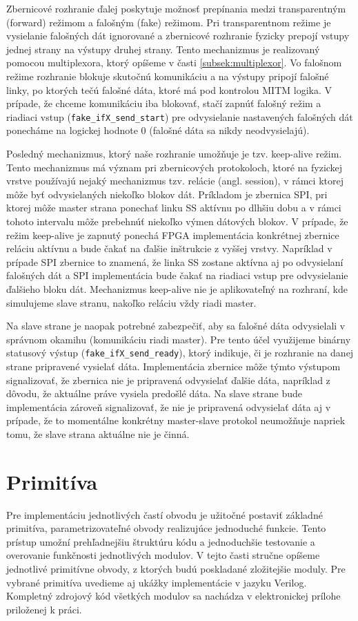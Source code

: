 Zbernicové rozhranie ďalej poskytuje možnosť prepínania medzi transparentným (forward) režimom a falošným (fake) režimom. Pri transparentnom režime je vysielanie falošných dát ignorované a zbernicové rozhranie fyzicky prepojí vstupy jednej strany na výstupy druhej strany. Tento mechanizmus je realizovaný pomocou multiplexora, ktorý opíšeme v časti \ref{subsek:multiplexor}. Vo falošnom režime rozhranie blokuje skutočnú komunikáciu a na výstupy pripojí falošné linky, po ktorých tečú falošné dáta, ktoré má pod kontrolou MITM logika. V prípade, že chceme komunikáciu iba blokovať, stačí zapnúť falošný režim a riadiaci vstup (\texttt{fake\_ifX\_send\_start}) pre odvysielanie nastavených falošných dát ponecháme na logickej hodnote 0 (falošné dáta sa nikdy neodvysielajú).

Posledný mechanizmus, ktorý naše rozhranie umožňuje je tzv. keep-alive režim. Tento mechanizmus má význam pri zbernicových protokoloch, ktoré na fyzickej vrstve používajú nejaký mechanizmus tzv. relácie (angl. session), v rámci ktorej môže byť odvysielaných niekoľko blokov dát. Príkladom je zbernica SPI, pri ktorej môže master strana ponechať linku SS aktívnu po dlhšiu dobu a v rámci tohoto intervalu môže prebehnúť niekoľko výmen dátových blokov. V prípade, že režim keep-alive je zapnutý ponechá FPGA implementácia konkrétnej zbernice reláciu aktívnu a bude čakať na ďalšie inštrukcie z vyššej vrstvy. Napríklad v prípade SPI zbernice to znamená, že linka SS zostane aktívna aj po odvysielaní falošných dát a SPI implementácia bude čakať na riadiaci vstup pre odvysielanie ďalšieho bloku dát. Mechanizmus keep-alive nie je aplikovateľný na rozhraní, kde simulujeme slave stranu, nakoľko reláciu vždy riadi master.

Na slave strane je naopak potrebné zabezpečiť, aby sa falošné dáta odvysielali v správnom okamihu (komunikáciu riadi master). Pre tento účel využijeme binárny statusový výstup (\texttt{fake\_ifX\_send\_ready}), ktorý indikuje, či je rozhranie na danej strane pripravené vysielať dáta. Implementácia zbernice môže týmto výstupom signalizovať, že zbernica nie je pripravená odvysielať ďalšie dáta, napríklad z dôvodu, že aktuálne práve vysiela predošlé dáta. Na slave strane bude implementácia zároveň signalizovať, že nie je pripravená odvysielať dáta aj v prípade, že to momentálne konkrétny master-slave protokol neumožňuje napriek tomu, že slave strana aktuálne nie je činná.

\section{Primitíva} \label{sek:primitives}
Pre implementáciu jednotlivých častí obvodu je užitočné postaviť základné primitíva, parametrizovateľné obvody realizujúce jednoduché funkcie. Tento prístup umožní prehľadnejšiu štruktúru kódu a jednoduchšie testovanie a overovanie funkčnosti jednotlivých modulov. V tejto časti stručne opíšeme jednotlivé primitívne obvody, z ktorých budú poskladané zložitejšie moduly. Pre vybrané primitíva uvedieme aj ukážky implementácie v jazyku Verilog. Kompletný zdrojový kód všetkých modulov sa nachádza v elektronickej prílohe priloženej k práci.

